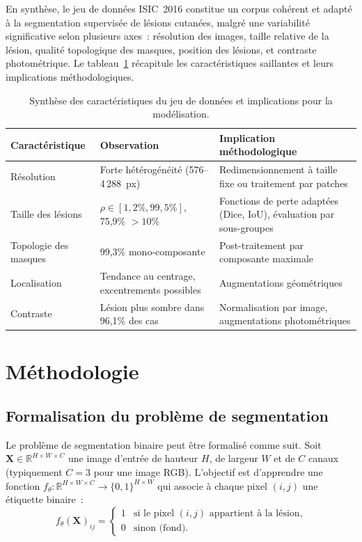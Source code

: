 \documentclass[12pt,a4paper]{article}
\newcommand{\R}{\mathbb{R}}
\begin{document}
En synthèse, le jeu de données ISIC~2016 constitue un corpus cohérent et adapté à la segmentation supervisée de lésions cutanées, malgré une variabilité significative selon plusieurs axes~: résolution des images, taille relative de la lésion, qualité topologique des masques, position des lésions, et contraste photométrique. Le tableau~\ref{tab:synthese} récapitule les caractéristiques saillantes et leurs implications méthodologiques.

\begin{table}[H]
\centering
\caption{Synthèse des caractéristiques du jeu de données et implications pour la modélisation.}
\label{tab:synthese}
\small
\begin{tabular}{p{4cm} p{4.5cm} p{5cm}}
\toprule
\textbf{Caractéristique} & \textbf{Observation} & \textbf{Implication méthodologique} \\
\midrule
Résolution & Forte hétérogénéité (576--4\,288~px) & Redimensionnement à taille fixe ou traitement par patches \\
\addlinespace
Taille des lésions & $\rho \in [1{,}2\%, 99{,}5\%]$, 75,9\% $> 10\%$ & Fonctions de perte adaptées (Dice, IoU), évaluation par sous-groupes \\
\addlinespace
Topologie des masques & 99,3\% mono-composante & Post-traitement par composante maximale \\
\addlinespace
Localisation & Tendance au centrage, excentrements possibles & Augmentations géométriques \\
\addlinespace
Contraste & Lésion plus sombre dans 96,1\% des cas & Normalisation par image, augmentations photométriques \\
\bottomrule
\end{tabular}
\end{table}


\section{Méthodologie}
\label{sec:methodologie}

\subsection{Formalisation du problème de segmentation}

Le problème de segmentation binaire peut être formalisé comme suit. Soit $\mathbf{X} \in \R^{H \times W \times C}$ une image d'entrée de hauteur $H$, de largeur $W$ et de $C$ canaux (typiquement $C = 3$ pour une image RGB). L'objectif est d'apprendre une fonction $f_\theta : \R^{H \times W \times C} \to \{0, 1\}^{H \times W}$ qui associe à chaque pixel $(i, j)$ une étiquette binaire~:
\begin{equation}
    f_\theta(\mathbf{X})_{ij} =
    \begin{cases}
        1 & \text{si le pixel $(i, j)$ appartient à la lésion,} \\
        0 & \text{sinon (fond).}
    \end{cases}
\end{equation}
\end{document}
